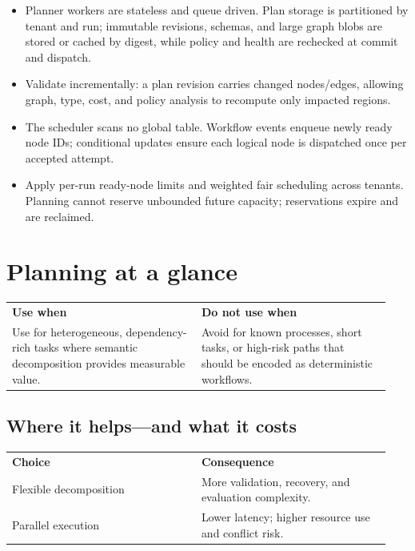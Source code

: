 \begin{itemize}

\item Planner workers are stateless and queue driven. Plan storage is partitioned by tenant and run; immutable revisions, schemas, and large graph blobs are stored or cached by digest, while policy and health are rechecked at commit and dispatch.

\item Validate incrementally: a plan revision carries changed nodes/edges, allowing graph, type, cost, and policy analysis to recompute only impacted regions.

\item The scheduler scans no global table. Workflow events enqueue newly ready node IDs; conditional updates ensure each logical node is dispatched once per accepted attempt.

\item Apply per-run ready-node limits and weighted fair scheduling across tenants. Planning cannot reserve unbounded future capacity; reservations expire and are reclaimed.

\end{itemize}

\section{Planning at a glance}

\BookTableStart
\small
\begin{tabular}{@{}Y{0.4700\linewidth}Y{0.4700\linewidth}@{}}
\color{white}\bfseries \textbf{Use when} & \color{white}\bfseries \textbf{Do not use when} \\
Use for heterogeneous, dependency-rich tasks where semantic decomposition provides measurable value. & Avoid for known processes, short tasks, or high-risk paths that should be encoded as deterministic workflows. \\
\end{tabular}
\BookTableEnd

\subsection{Where it helps—and what it costs}

\BookTableStart
\small
\begin{tabular}{@{}Y{0.4700\linewidth}Y{0.4700\linewidth}@{}}
\color{white}\bfseries \textbf{Choice} & \color{white}\bfseries \textbf{Consequence} \\
Flexible decomposition & More validation, recovery, and evaluation complexity. \\
Parallel execution & Lower latency; higher resource use and conflict risk. \\
\end{tabular}
\BookTableEnd

